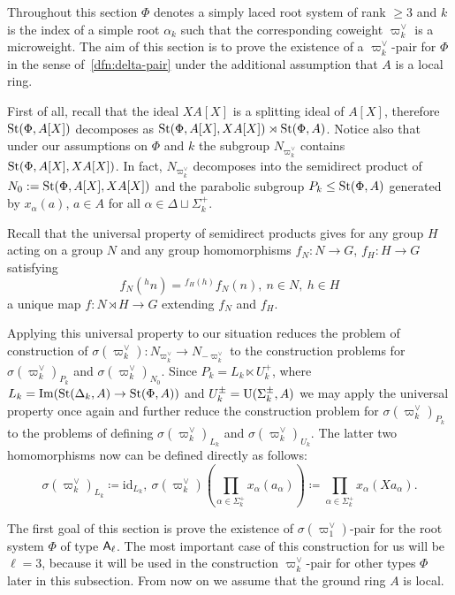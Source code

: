 Throughout this section $\Phi$ denotes a simply laced root system of rank $\geq 3$ and $k$ is the index of
 a simple root $\alpha_k$ such that the corresponding coweight $\varpi_k^\vee$ is a microweight.
The aim of this section is to prove the existence of a $\varpi_k^\vee$-pair for $\Phi$ in the sense of~\cref{dfn:delta-pair}
 under the additional assumption that $A$ is a local ring.

First of all, recall that the ideal $XA[X]$ is a splitting ideal of $A[X]$, therefore
$\operatorname{St}(\Phi, A[X])$ decomposes as $\operatorname{St}(\Phi, A[X], XA[X]) \rtimes \operatorname{St}(\Phi, A)$.
Notice also that under our assumptions on $\Phi$ and $k$ the subgroup $N_{\varpi_k^\vee}$ contains $\operatorname{St}(\Phi, A[X], XA[X])$.
In fact, $N_{\varpi_k^\vee}$ decomposes into the semidirect product of $N_0 := \operatorname{St}(\Phi, A[X], XA[X])$ and the parabolic subgroup $P_k \leq \operatorname{St}(\Phi, A)$
generated by $x_\alpha(a)$, $a \in A$ for all $\alpha \in \Delta \sqcup \Sigma^+_k$.

Recall that the universal property of semidirect products gives for any group $H$ acting on a group $N$
and any group homomorphisms $f_N\colon N \to G$, $f_H\colon H \to G$ satisfying
\begin{equation}
    \label{eq:coherence-condition} f_N({}^hn) = {}^{f_H(h)} f_N(n),\ n\in N,\ h\in H
\end{equation}
a unique map $f\colon N \rtimes H \to G$ extending $f_N$ and $f_H$.

Applying this universal property to our situation reduces the problem of construction of $\sigma(\varpi_k^\vee) \colon N_{\varpi_k^\vee} \to N_{-\varpi_k^\vee}$
to the construction problems for $\sigma(\varpi_k^\vee)_{P_k}$ and $\sigma(\varpi_k^\vee)_{N_0}$.
Since $P_k = L_k \ltimes U_k^+$, where $L_k = \mathrm{Im}(\operatorname{St}(\Delta_k, A) \to \operatorname{St}(\Phi, A))$
and $U_k^\pm = \operatorname{U}(\Sigma_k^\pm, A)$ we may apply the universal property once again and further reduce the construction problem for $\sigma(\varpi_k^\vee)_{P_k}$
to the problems of defining $\sigma(\varpi_k^\vee)_{L_k}$ and $\sigma(\varpi_k^\vee)_{U_k}$.
The latter two homomorphisms now can be defined directly as follows:
\[\sigma(\varpi_k^\vee)_{L_k} \coloneqq \mathrm{id}_{L_k},\ \sigma(\varpi_k^\vee)\left(\prod\limits_{\alpha \in \Sigma_k^+} x_\alpha(a_\alpha)\right) \coloneqq \prod\limits_{\alpha \in \Sigma_k^+} x_\alpha(Xa_\alpha).\]

The first goal of this section is prove the existence of $\sigma(\varpi_1^\vee)$-pair for the root system $\Phi$ of type $\mathsf{A}_\ell$.
The most important case of this construction for us will be $\ell = 3$, because it will be used in the construction $\varpi_k^\vee$-pair for other types $\Phi$ later in this subsection.
From now on we assume that the ground ring $A$ is local.

